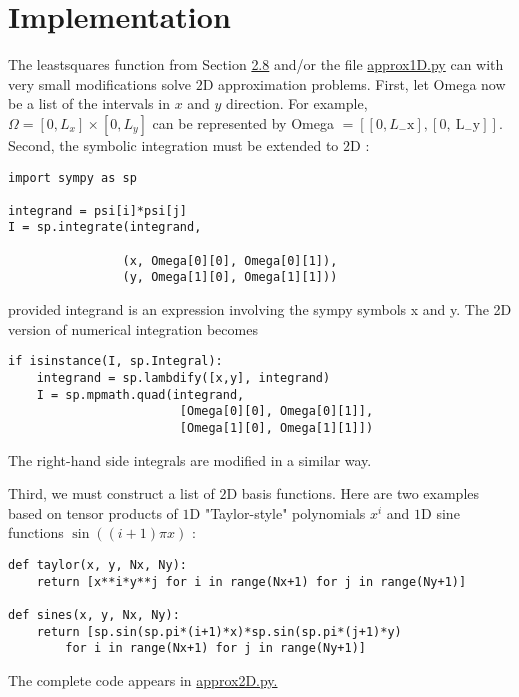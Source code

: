 \documentclass[../main.tex]{subfiles}
\begin{document}
\section[Implementation]{Implementation}
\label{sec:sec_8_3}
\noindent The least\textunderscore squares function from Section \hyperref[sec:sec_2_8]{2.8} and/or the file \href{https://github.com/hplgit/INF5620/blob/master/src/fem/fe_approx1D.py}{approx1D.py} can with very small modifications solve $2 \mathrm{D}$ approximation problems. First, let Omega now be a list of the intervals in $x$ and $y$ direction. For example, $\Omega=\left[0, L_{x}\right] \times\left[0, L_{y}\right]$ can be represented by Omega $=\left[\left[0, L_{-} \mathrm{x}\right],\left[0, \mathrm{~L}_{-} \mathrm{y}\right]\right]$. Second, the symbolic integration must be extended to $2 \mathrm{D}$ :
\begin{lstlisting}[numbers=none]
import sympy as sp

integrand = psi[i]*psi[j]
I = sp.integrate(integrand,

				(x, Omega[0][0], Omega[0][1]),
				(y, Omega[1][0], Omega[1][1]))	
\end{lstlisting}
provided integrand is an expression involving the sympy symbols x and y. The
2D version of numerical integration becomes
\begin{lstlisting}[numbers=none]
if isinstance(I, sp.Integral):
	integrand = sp.lambdify([x,y], integrand)
	I = sp.mpmath.quad(integrand,
						[Omega[0][0], Omega[0][1]],
						[Omega[1][0], Omega[1][1]])	
\end{lstlisting}
The right-hand side integrals are modified in a similar way.

Third, we must construct a list of $2 \mathrm{D}$ basis functions. Here are two examples based on tensor products of $1 \mathrm{D}$ "Taylor-style" polynomials $x^{i}$ and $1 \mathrm{D}$ sine functions $\sin ((i+1) \pi x)$ :
\begin{lstlisting}[numbers=none]
def taylor(x, y, Nx, Ny):
	return [x**i*y**j for i in range(Nx+1) for j in range(Ny+1)]
	
def sines(x, y, Nx, Ny):
	return [sp.sin(sp.pi*(i+1)*x)*sp.sin(sp.pi*(j+1)*y)
		for i in range(Nx+1) for j in range(Ny+1)]	
\end{lstlisting}
The complete code appears in \href{http://tinyurl.com/jvzzcfn/fem/fe_approx2D.py}{approx2D.py.}
\end{document}

